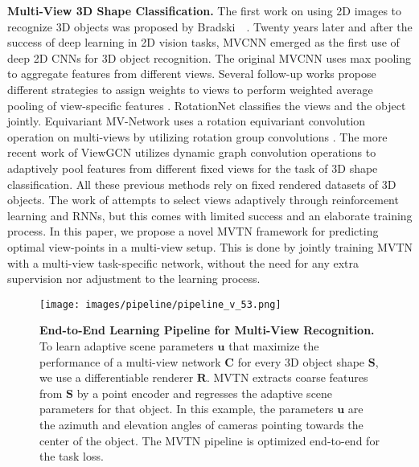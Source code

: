 \documentclass[10pt,twocolumn,letterpaper]{article}
\newcommand{\mysection}[1]{\noindent\textbf{#1.}}
\begin{document}
\mysection{Multi-View 3D Shape Classification}
The first work on using 2D images to recognize 3D objects was proposed by Bradski~\etal~\cite{bradski1994recognition}. Twenty years later and after the success of deep learning in 2D vision tasks, MVCNN \cite{mvcnn} emerged as the first use of deep 2D CNNs for 3D object recognition. The original MVCNN uses max pooling to aggregate features from different views. Several follow-up works propose different strategies to assign weights to views to perform weighted average pooling of view-specific features \cite{mvnhbn,mvrelations,mvgvcnn,mvvram}. RotationNet \cite{mvrotationnet} classifies the views and the object jointly. Equivariant MV-Network \cite{mvequivariant} uses a rotation equivariant convolution operation on multi-views by utilizing rotation group convolutions \cite{groupconv}. The more recent work of ViewGCN \cite{mvviewgcn} utilizes dynamic graph convolution operations to adaptively pool features from different fixed views for the task of 3D shape classification. All these previous methods rely on fixed rendered datasets of 3D objects. The work of \cite{mvvram} attempts to select views adaptively through reinforcement learning and RNNs, but this comes with limited success and an elaborate training process. In this paper, we propose a novel MVTN framework for predicting optimal view-points in a multi-view setup. This is done by jointly training MVTN with a multi-view task-specific network, without the need for any extra supervision nor adjustment to the learning process. 


\begin{figure*}
    \centering
    \texttt{[image: images/pipeline/pipeline\_v\_53.png]}
    \caption{\textbf{End-to-End Learning Pipeline for Multi-View Recognition.} To learn adaptive scene parameters $\mathbf{u}$ that maximize the performance of a multi-view network $\mathbf{C}$ for every 3D object shape $\mathbf{S}$, we use a differentiable renderer $\mathbf{R}$. MVTN extracts coarse features from $\mathbf{S}$ by a point encoder and regresses the adaptive scene parameters for that object. In this example, the parameters $\mathbf{u}$ are the azimuth and elevation angles of cameras pointing towards the center of the object. The MVTN pipeline is optimized end-to-end for the task loss. 
    }
    \label{fig:pipeline}
\end{figure*}
\end{document}
